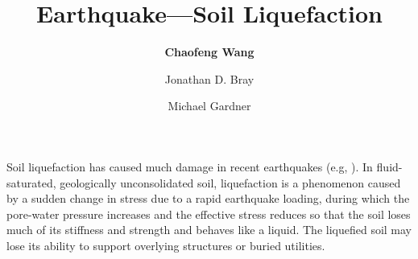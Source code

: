 %
%
%


%
%
%
%
%
%
%
%

\title{Earthquake---Soil Liquefaction}
\author{
    \textbf{Chaofeng Wang} 
    \and Jonathan D. Bray
    \and Michael Gardner}
\tocauthor{}
%
%
\maketitle

Soil liquefaction has caused much damage in recent earthquakes (e.g, \cite{cubrinovski2011geotechnical, cubrinovski2017liquefaction, bray2017new}). In fluid-saturated, geologically unconsolidated soil, liquefaction is a phenomenon caused by a sudden change in stress due to a rapid earthquake loading, during which the pore-water pressure increases and the effective stress reduces so that the soil loses much of its stiffness and strength and behaves like a liquid. The liquefied soil may lose its ability to support overlying structures or buried utilities. 

